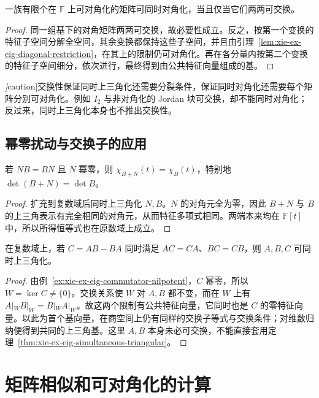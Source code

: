 \begin{theorem}
\label{thm:xie-ex-eig-simultaneous-diagonal}
一族有限个在 $\mathbb F$ 上可对角化的矩阵可同时对角化，当且仅当它们两两可交换。
\end{theorem}
\begin{proof}
同一组基下的对角矩阵两两可交换，故必要性成立。反之，按第一个变换的特征子空间分解全空间，其余变换都保持这些子空间，并且由引理~\ref{lem:xie-ex-eig-diagonal-restriction}，在其上的限制仍可对角化。再在各分量内按第二个变换的特征子空间细分，依次进行，最终得到由公共特征向量组成的基。
\end{proof}

\emph[caution]{交换性保证同时上三角化还需要分裂条件，保证同时对角化还需要每个矩阵分别可对角化。}例如 $I_2$ 与非对角化的 Jordan 块可交换，却不能同时对角化；反过来，同时上三角化本身也不推出交换性。

\subsection{幂零扰动与交换子的应用}

\begin{proposition}
若 $NB=BN$ 且 $N$ 幂零，则 $\chi_{B+N}(t)=\chi_B(t)$，特别地 $\det(B+N)=\det B$。
\end{proposition}
\begin{proof}
扩充到复数域后同时上三角化 $N,B$。$N$ 的对角元全为零，因此 $B+N$ 与 $B$ 的上三角表示有完全相同的对角元，从而特征多项式相同。两端本来均在 $\mathbb F[t]$ 中，所以所得恒等式也在原数域上成立。
\end{proof}

\begin{proposition}
在复数域上，若 $C=AB-BA$ 同时满足 $AC=CA$、$BC=CB$，则 $A,B,C$ 可同时上三角化。
\end{proposition}
\begin{proof}
由例~\ref{ex:xie-ex-eig-commutator-nilpotent}，$C$ 幂零，所以 $W=\ker C\ne\{0\}$。交换关系使 $W$ 对 $A,B$ 都不变，而在 $W$ 上有 $A|_WB|_W=B|_WA|_W$。故这两个限制有公共特征向量，它同时也是 $C$ 的零特征向量。以此为首个基向量，在商空间上仍有同样的交换子等式与交换条件；对维数归纳便得到共同的上三角基。这里 $A,B$ 本身未必可交换，不能直接套用定理~\ref{thm:xie-ex-eig-simultaneous-triangular}。
\end{proof}

\section{矩阵相似和可对角化的计算}
\label{sec:xie-ex-eig-similarity-computation}

